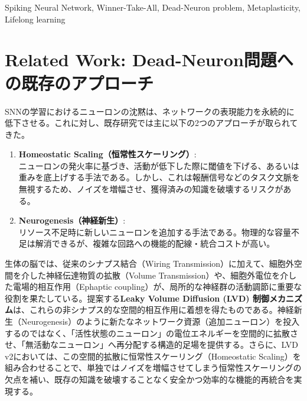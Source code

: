 \documentclass[submit]{ipsj}
\begin{document}
\begin{ekeyword}
Spiking Neural Network, Winner-Take-All, Dead-Neuron problem, Metaplasticity, Lifelong learning
\end{ekeyword}

\maketitle

\section{Related Work: Dead-Neuron問題への既存のアプローチ}
SNNの学習におけるニューロンの沈黙は、ネットワークの表現能力を永続的に低下させる。これに対し、既存研究では主に以下の2つのアプローチが取られてきた。

\begin{enumerate}
    \item \textbf{Homeostatic Scaling（恒常性スケーリング）}: \\
    ニューロンの発火率に基づき、活動が低下した際に閾値を下げる、あるいは重みを底上げする手法である\cite{brunel2000dynamics}。しかし、これは報酬信号などのタスク文脈を無視するため、ノイズを増幅させ、獲得済みの知識を破壊するリスクがある。
    \item \textbf{Neurogenesis（神経新生）}: \\
    リソース不足時に新しいニューロンを追加する手法である\cite{huang2023neurogenesis}。物理的な容量不足は解消できるが、複雑な回路への機能的配線・統合コストが高い。
\end{enumerate}

生体の脳では、従来のシナプス結合（Wiring Transmission）に加えて、細胞外空間を介した神経伝達物質の拡散（Volume Transmission\cite{agnati1995intercellular}）や、細胞外電位を介した電場的相互作用（Ephaptic coupling\cite{anastassiou2011ephaptic}）が、局所的な神経群の活動調節に重要な役割を果たしている。提案する\textbf{Leaky Volume Diffusion (LVD) 制御メカニズム}は、これらの非シナプス的な空間的相互作用に着想を得たものである。神経新生（Neurogenesis）のように新たなネットワーク資源（追加ニューロン）を投入するのではなく、「活性状態のニューロン」の電位エネルギーを空間的に拡散させ、「無活動なニューロン」へ再分配する構造的足場を提供する。さらに、LVD v2においては、この空間的拡散に恒常性スケーリング（Homeostatic Scaling）を組み合わせることで、単独ではノイズを増幅させてしまう恒常性スケーリングの欠点を補い、既存の知識を破壊することなく安全かつ効率的な機能的再統合を実現する。
\end{document}
